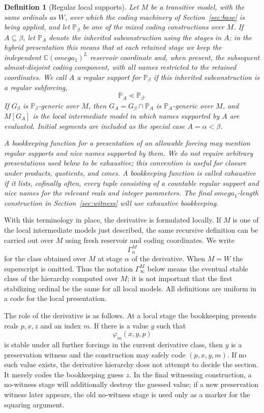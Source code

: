 \documentclass{article}
\newtheorem{definition}[theorem]{Definition}
\theoremstyle{remark}
\theoremstyle{plain}
\newcommand{\forceP}{\mathbb{P}}
\def\omega{omega}%
\begin{document}
\begin{definition}[Regular local supports]\label{def:local-supports}
Let $M$ be a transitive model, with the same ordinals as $W$, over which the
coding machinery of Section~\ref{sec:base} is being applied, and let
$\forceP_\beta$ be one of the mixed coding constructions over $M$. If
$A\subseteq\beta$, let $\forceP_A$ denote the inherited subconstruction using the
stages in $A$; in the hybrid presentation this means that at each retained stage
we keep the independent $\mathbb C(\omega_1)^L$ reservoir coordinate and, when
present, the subsequent almost-disjoint coding component, with all names
restricted to the retained coordinates. We call $A$ a \emph{regular support}
for $\forceP_\beta$ if this inherited subconstruction is a regular subforcing,
\[
   \forceP_A\lessdot \forceP_\beta.
\]
If $G_\beta$ is $\forceP_\beta$-generic over $M$, then
$G_A=G_\beta\cap\forceP_A$ is $\forceP_A$-generic over $M$, and $M[G_A]$ is the
local intermediate model in which names supported by $A$ are evaluated. Initial
segments are included as the special case $A=\alpha<\beta$.

A bookkeeping function for a presentation of an allowable forcing may mention
regular supports and nice names supported by them. We do not require arbitrary
presentations used below to be exhaustive; this convention is useful for closure
under products, quotients, and cones. A bookkeeping function is called
\emph{exhaustive} if it lists, cofinally often, every tuple consisting of a
countable regular support and nice names for the relevant reals and integer
parameters. The final $\omega_1$-length construction in
Section~\ref{sec:witness} will use exhaustive bookkeeping.
\end{definition}

With this terminology in place, the derivative is formulated locally. If $M$ is
one of the local intermediate models just described, the same recursive
definition can be carried out over $M$ using fresh reservoir and coding
coordinates. We write
\[
   \Gamma^M_\alpha
\]
for the class obtained over $M$ at stage $\alpha$ of the derivative. When
$M=W$ the superscript is omitted. Thus the notation $\Gamma^M_\infty$ below
means the eventual stable class of the hierarchy computed over $M$; it is not
important that the first stabilizing ordinal be the same for all local models.
All definitions are uniform in a code for the local presentation.

The role of the derivative is as follows. At a local stage the bookkeeping
presents reals $p,x,z$ and an index $m$. If there is a value $y$ such that
\[
   \varphi_m(x,y,p)
\]
is stable under all further forcings in the current derivative class, then $y$ is
a preservation witness and the construction may safely code $(p,x,y,m)$. If no
such value exists, the derivative hierarchy does not attempt to decide the
section. It merely codes the bookkeeping guess $z$. In the final witnessing
construction, a no-witness stage will additionally destroy the guessed value; if
a new preservation witness later appears, the old no-witness stage is used only
as a marker for the squaring argument.
\end{document}
